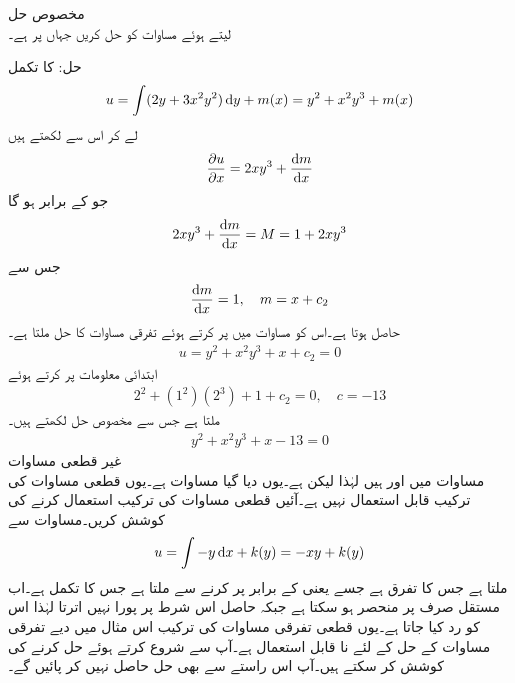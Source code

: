 \quad مخصوص حل\\
 لیتے ہوئے مساوات  کو حل کریں  جہاں  پر  ہے۔

حل: کا  تکمل
\begin{align}\label{مساوات_سادہ_اول_قطعی_دوسرا_متغیر}
u=\int (2y+3x^2y^2)\dif y+m(x)=y^2+x^2y^3+m(x)
\end{align} 
لے کر اس سے  لکھتے ہیں
\begin{align*}
\frac{\partial u}{\partial x}=2xy^3+\frac{\dif m}{\dif x}
\end{align*}
جو  کے برابر ہو گا
\begin{align*}
2xy^3+\frac{\dif m}{\dif x}=M=1+2xy^3
\end{align*}
جس سے
\begin{align*}
\frac{\dif m}{\dif x}=1, \quad m=x+c_2
\end{align*}
حاصل ہوتا ہے۔اس کو مساوات  میں پر کرتے ہوئے تفرقی مساوات کا حل ملتا ہے۔
\begin{align*}
u=y^2+x^2y^3+x+c_2=0
\end{align*}
ابتدائی معلومات پر کرتے ہوئے
\begin{align*}
2^2+(1^2) (2^3)+1+c_2=0, \quad c=-13
\end{align*}
ملتا ہے جس سے مخصوص حل لکھتے ہیں۔
\begin{align*}
y^2+x^2y^3+x-13=0
\end{align*}
\quad غیر قطعی مساوات\\
مساوات  میں  اور  ہیں لہٰذا  لیکن  ہے۔یوں دیا گیا مساوات  ہے۔یوں قطعی مساوات کی ترکیب قابل استعمال نہیں ہے۔آئیں قطعی مساوات کی ترکیب استعمال کرنے کی کوشش کریں۔مساوات  سے
\begin{align*}
u=\int -y \dif x+k(y)=-xy+k(y)
\end{align*}
ملتا ہے جس کا  تفرق  ہے جسے  یعنی  کے برابر پر کرنے سے 
 ملتا ہے جس کا تکمل  ہے۔اب مستقل  صرف  پر منحصر ہو سکتا ہے جبکہ حاصل  اس شرط پر پورا نہیں اترتا لہٰذا اس کو رد کیا جاتا ہے۔یوں قطعی تفرقی مساوات کی ترکیب اس مثال میں دیے تفرقی مساوات کے حل کے لئے نا قابل استعمال ہے۔آپ  سے شروع کرتے ہوئے حل کرنے کی کوشش کر سکتے ہیں۔آپ اس راستے سے بھی حل حاصل نہیں کر پائیں گے۔

